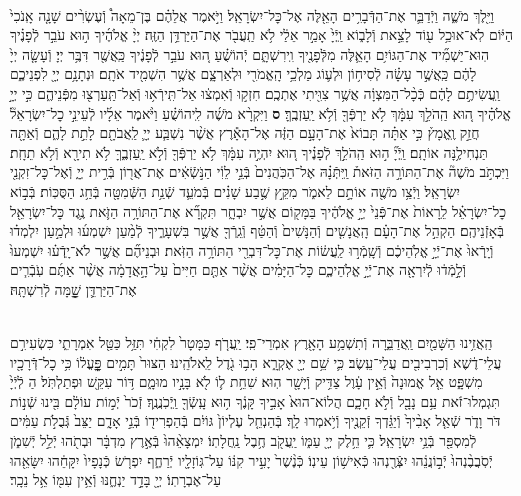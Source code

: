 \documentclass[twoside, openany, parskip=half, 11pt]{book}
\begin{document}
\begin{footnotesize}
\begin{multicols}{2}
\\
וַיֵּ֖לֶךְ מֹשֶׁ֑ה וַיְֿדַבֵּ֛ר אֶת־הַדְּֿבָרִ֥ים הָאֵ֖לֶּה אֶל־כׇּל־יִשְׂרָאֵֽל׃ וַיֹּ֣אמֶר אֲלֵהֶ֗ם בֶּן־מֵאָה֩ וְֿעֶשְׂרִ֨ים שָׁנָ֤ה אָֽנֹכִי֙ הַיּ֔וֹם לֹֽא־אוּכַ֥ל ע֖וֹד לָצֵ֣את וְֿלָב֑וֹא וַֽיְֿיָ֙ אָמַ֣ר אֵלַ֔י לֹ֥א תַֽעֲבֹ֖ר אֶת־הַיַּרְדֵּ֥ן הַזֶּֽה׃ יְיָ֨ אֱלֹהֶ֜יךָ ה֣וּא עֹבֵ֣ר לְֿפָנֶ֗יךָ הֽוּא־יַשְׁמִ֞יד אֶת־הַגּוֹיִ֥ם הָאֵ֛לֶּה מִלְּֿפָנֶ֖יךָ וִֽירִשְׁתָּ֑ם יְֿהוֹשֻׁ֗עַ ה֚וּא עֹבֵ֣ר לְֿפָנֶ֔יךָ כַּֽאֲשֶׁ֖ר דִּבֶּ֥ר יְיָ׃
וְֿעָשָׂ֤ה יְיָ֙ לָהֶ֔ם כַּֽאֲשֶׁ֣ר עָשָׂ֗ה לְֿסִיח֥וֹן וּלְע֛וֹג מַלְכֵ֥י הָֽאֱמֹרִ֖י וּלְאַרְצָ֑ם אֲשֶׁ֥ר הִשְׁמִ֖יד אֹתָֽם׃ וּנְתָנָ֥ם יְיָ֖ לִפְנֵיכֶ֑ם וַֽעֲשִׂיתֶ֣ם לָהֶ֔ם כְּֿכָ֨ל־הַמִּצְוָ֔ה אֲשֶׁ֥ר צִוִּ֖יתִי אֶתְכֶֽם׃ חִזְק֣וּ וְֿאִמְצ֔וּ אַל־תִּֽירְֿא֥וּ וְֿאַל־תַּֽעַרְצ֖וּ מִפְּֿנֵיהֶ֑ם כִּ֣י יְיָ֣ אֱלֹהֶ֗יךָ ה֚וּא הַֽהֹלֵ֣ךְ עִמָּ֔ךְ לֹ֥א יַרְפְּֿךָ֖ וְֿלֹ֥א יַֽעַזְבֶֽךָּ׃ \textbf{ס}
וַיִּקְרָ֨א מֹשֶׁ֜ה לִֽיהוֹשֻׁ֗עַ וַיֹּ֨אמֶר אֵלָ֜יו לְֿעֵינֵ֣י כׇל־יִשְׂרָאֵל֘ חֲזַ֣ק וֶֽאֱמָץ֒ כִּ֣י אַתָּ֗ה תָּבוֹא֙ אֶת־הָעָ֣ם הַזֶּ֔ה אֶל־הָאָ֕רֶץ אֲשֶׁ֨ר נִשְׁבַּ֧ע יְיָ֛ לַֽאֲבֹתָ֖ם לָתֵ֣ת לָהֶ֑ם וְֿאַתָּ֖ה תַּנְחִילֶ֥נָּה אוֹתָֽם׃ וַֽיְֿיָ֞ ה֣וּא הַֽהֹלֵ֣ךְ לְֿפָנֶ֗יךָ ה֚וּא יִהְיֶ֣ה עִמָּ֔ךְ לֹ֥א יַרְפְּֿךָ֖ וְֿלֹ֣א יַֽעַזְבֶ֑ךָּ לֹ֥א תִירָ֖א וְֿלֹ֥א תֵחָֽת׃ וַיִּכְתֹּ֣ב מֹשֶׁה֘ אֶת־הַתּוֹרָ֣ה הַזֹּאת֒ וַֽיִּתְּֿנָ֗הּ אֶל־הַכֹּֽהֲנִים֙ בְּֿנֵ֣י לֵוִ֔י הַנֹּ֣שְֿׂאִ֔ים אֶת־אֲר֖וֹן בְּֿרִ֣ית יְיָ֑ וְֿאֶל־כׇּל־זִקְנֵ֖י יִשְׂרָאֵֽל׃ וַיְֿצַ֥ו מֹשֶׁ֖ה אוֹתָ֣ם לֵאמֹ֑ר מִקֵּ֣ץ שֶׁ֣בַע שָׁנִ֗ים בְּֿמֹעֵ֛ד שְֿׁנַ֥ת הַשְּֿׁמִטָּ֖ה בְּֿחַ֥ג הַסֻּכּֽוֹת׃ בְּֿב֣וֹא כׇל־יִשְׂרָאֵ֗ל לֵֽרָאוֹת֙ אֶת־פְּֿנֵי֙ יְיָ֣ אֱלֹהֶ֔יךָ בַּמָּק֖וֹם אֲשֶׁ֣ר יִבְחָ֑ר תִּקְרָ֞א אֶת־הַתּוֹרָ֥ה הַזֹּ֛את נֶ֥גֶד כׇּל־יִשְׂרָאֵ֖ל בְּֿאָזְֿנֵיהֶֽם׃ הַקְהֵ֣ל אֶת־הָעָ֗ם הָֽאֲנָשִׁ֤ים וְֿהַנָּשִׁים֙ וְֿהַטַּ֔ף וְֿגֵֽרְֿךָ֖ אֲשֶׁ֣ר בִּשְׁעָרֶ֑יךָ לְֿמַ֨עַן יִשְׁמְע֜וּ וּלְמַ֣עַן יִלְמְד֗וּ וְֿיָֽרְֿאוּ֙ אֶת־יְֿיָ֣ אֱלֹֽהֵיכֶ֔ם וְֿשָֽׁמְֿר֣וּ לַֽעֲשׂ֔וֹת אֶת־כׇּל־דִּבְרֵ֖י הַתּוֹרָ֥ה הַזֹּֽאת׃ וּבְנֵיהֶ֞ם אֲשֶׁ֣ר לֹא־יָֽדְֿע֗וּ יִשְׁמְעוּ֙ וְֿלָ֣מְֿד֔וּ לְֿיִרְאָ֖ה אֶת־יְֿיָ֣ אֱלֹֽהֵיכֶ֑ם כׇּל־הַיָּמִ֗ים אֲשֶׁ֨ר אַתֶּ֤ם חַיִּים֙ עַל־הָ֣אֲדָמָ֔ה אֲשֶׁ֨ר אַתֶּ֜ם עֹֽבְֿרִ֧ים אֶת־הַיַּרְדֵּ֛ן שׇׇׇָׁ֖מָּה לְֿרִשְׁתָּֽהּ׃

\\
הַֽאֲזִ֥ינוּ הַשָּׁמַ֖יִם וַֽאֲדַבֵּ֑רָה וְֿתִשְׁמַ֥ע הָאָ֖רֶץ אִמְרֵי־פִֽי׃
יַֽעֲרֹ֤ף כַּמָּטָר֙ לִקְחִ֔י תִּזַּ֥ל כַּטַּ֖ל אִמְרָתִ֑י
כִּשְׂעִירִ֣ם עֲלֵי־דֶ֔שֶׁא וְֿכִרְבִיבִ֖ים עֲלֵי־עֵֽשֶׂב׃
כִּ֛י שֵׁ֥ם יְיָ֖ אֶקְרָ֑א הָב֥וּ גֹ֖דֶל לֵֽאלֹהֵֽינוּ׃
הַצּוּר֙ תָּמִ֣ים פׇׇׇׇׇָּֽעֳל֔וֹ כִּ֥י כׇל־דְּֿרָכָ֖יו מִשְׁפָּ֑ט
אֵ֤ל אֱמוּנָה֙ וְֿאֵ֣ין עָ֔וֶל צַדִּ֥יק וְֿיָשָׁ֖ר הֽוּא׃
שִׁחֵ֥ת ל֛וֹ לֹ֖א בָּנָ֣יו מוּמָ֑ם דּ֥וֹר עִקֵּ֖שׁ וּפְתַלְתֹּֽל׃
הַ לְֿיְֿיָ֙ תִּגְמְלוּ־זֹ֔את עַ֥ם נָבָ֖ל וְֿלֹ֣א חָכָ֑ם
הֲלוֹא־הוּא֙ אָבִ֣יךָ קָּנֶ֔ךָ ה֥וּא עָֽשְֿׂךָ֖ וַֽיְֿכֹֽנֲנֶֽךָ׃
זְֿכֹר֙ יְֿמ֣וֹת עוֹלָ֔ם בִּ֖ינוּ שְֿׁנ֣וֹת דֹּר וָדֹ֑ר
שְֿׁאַ֤ל אָבִ֨יךָ֙ וְֿיַגֵּ֔דְךָ זְֿקֵנֶ֖יךָ וְֿיֹ֥אמְרוּ לָֽךְ׃
בְּֿהַנְחֵ֤ל עֶלְיוֹן֙ גּוֹיִ֔ם בְּֿהַפְרִיד֖וֹ בְּֿנֵ֣י אָדָ֑ם
יַצֵּב֙ גְּֿבֻלֹ֣ת עַמִּ֔ים לְֿמִסְפַּ֖ר בְּֿנֵ֥י יִשְׂרָאֵֽל׃
כִּ֛י חֵ֥לֶק יְיָ֖ עַמּ֑וֹ יַֽעֲקֹ֖ב חֶ֥בֶל נַֽחֲלָתֽוֹ׃
יִמְצָאֵ֨הוּ֙ בְּֿאֶ֣רֶץ מִדְבָּ֔ר וּבְתֹ֖הוּ יְֿלֵ֣ל יְֿשִׁמֹ֑ן
יְֿסֹֽבֲבֶ֨נְהוּ֙ יְֿב֣וֹנֲנֵ֔הוּ יִצְּֿרֶ֖נְהוּ כְּֿאִישׁ֥וֹן עֵינֽוֹ׃
כְּֿנֶ֨שֶׁר֙ יָעִ֣יר קִנּ֔וֹ עַל־גּֽוֹזָלָ֖יו יְֿרַחֶ֑ף
יִפְרֹ֤שׂ כְּֿנָפָיו֙ יִקָּחֵ֔הוּ יִשָּׂאֵ֖הוּ עַל־אֶבְרָתֽוֹ׃
יְיָ֖ בָּדָ֣ד יַנְחֶ֑נּוּ וְֿאֵ֥ין עִמּ֖וֹ אֵ֥ל נֵכָֽר׃


\end{multicols}
\end{footnotesize}
\end{document}
